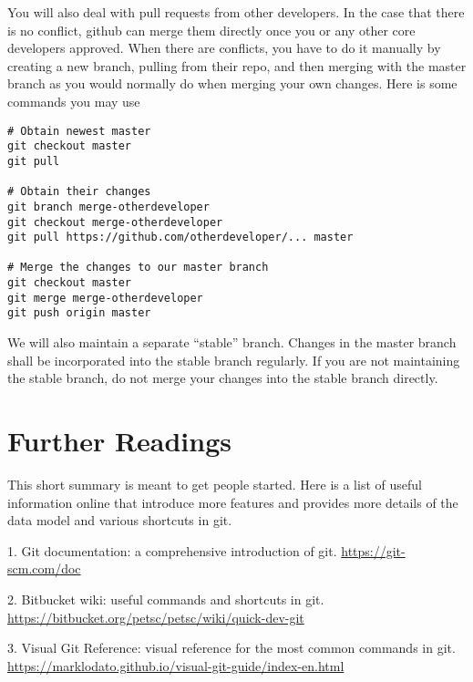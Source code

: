 \documentclass[runningheads,letterpaper]{llncs}
\begin{document}
You will also deal with pull requests from other developers.
In the case that there is no conflict, github can merge them directly once you or any other core developers approved.
When there are conflicts, you have to do it manually by creating a new branch, pulling from their repo, and then merging with the master branch as you would normally do when merging your own changes.
Here is some commands you may use
\begin{verbatim}
# Obtain newest master
git checkout master
git pull

# Obtain their changes
git branch merge-otherdeveloper
git checkout merge-otherdeveloper
git pull https://github.com/otherdeveloper/... master

# Merge the changes to our master branch
git checkout master
git merge merge-otherdeveloper
git push origin master
\end{verbatim}

We will also maintain a separate ``stable'' branch.
Changes in the master branch shall be incorporated into the stable branch regularly.
If you are not maintaining the stable branch, do not merge your changes into the stable branch directly.

\section{Further Readings}

This short summary is meant to get people started.
Here is a list of useful information online that introduce more features and provides more details of the data model and various shortcuts in git.

1. Git documentation: a comprehensive introduction of git. \url{https://git-scm.com/doc}

2. Bitbucket wiki: useful commands and shortcuts in git. \url{https://bitbucket.org/petsc/petsc/wiki/quick-dev-git}

3. Visual Git Reference: visual reference for the most common commands in git. \url{https://marklodato.github.io/visual-git-guide/index-en.html}
\end{document}
